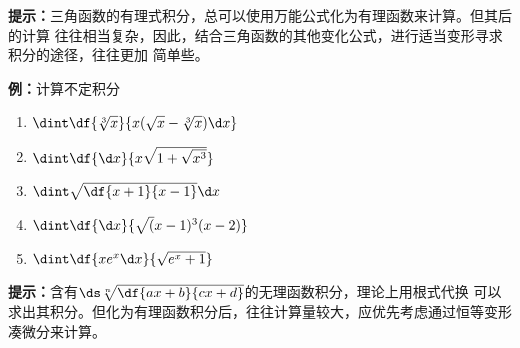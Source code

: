 \begin{shaded}
{\bf 提示：}三角函数的有理式积分，总可以使用万能公式化为有理函数来计算。但其后的计算
往往相当复杂，因此，结合三角函数的其他变化公式，进行适当变形寻求积分的途径，往往更加
简单些。
\end{shaded}

{\bf 例：}计算不定积分
\begin{enumerate}[(1)]
  \setlength{\itemindent}{1cm}
  \item $\dint\df{\sqrt[3]x}{x(\sqrt x-\sqrt[3]x)\d x}$
  \item $\dint\df{\d x}{x\sqrt{1+\sqrt{x^3}}}$
  \item $\dint\sqrt{\df{x+1}{x-1}}\d x$
  \item $\dint\df{\d x}{\sqrt(x-1)^3(x-2)}$
  \item $\dint\df{xe^x\d x}{\sqrt{e^x+1}}$
\end{enumerate}

% 
% 

\begin{shaded}
{\bf 提示：}含有$\ds\sqrt[n]{\df{ax+b}{cx+d}}$的无理函数积分，理论上用根式代换
可以求出其积分。但化为有理函数积分后，往往计算量较大，应优先考虑通过恒等变形凑微分来计算。
\end{shaded}